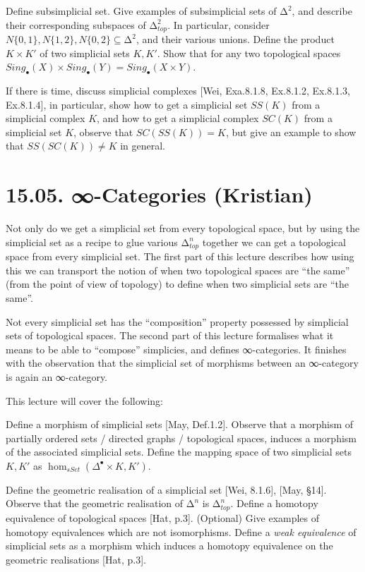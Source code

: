 \documentclass[a4paper]{amsart}
\numberwithin{figure}{section}
\theoremstyle{theorem}
\theoremstyle{definition}
\begin{document}
Define subsimplicial set. %
Give examples of subsimplicial sets of $∆^2$, and describe their corresponding subspaces of $∆^2_{top}$. In particular, consider $N\{0,1\}, N\{1,2\}, N\{0,2\} \subseteq ∆^2$, and their various unions. %
Define the product $K \times K'$ of two simplicial sets $K, K'$. %
Show that for any two topological spaces $Sing_\bullet(X) \times Sing_\bullet(Y) = Sing_\bullet(X \times Y)$. %

If there is time, discuss simplicial complexes [Wei, Exa.8.1.8, Ex.8.1.2, Ex.8.1.3, Ex.8.1.4], in particular, show how to get a simplicial set $SS(K)$ from a simplicial complex $K$, and how to get a simplicial complex $SC(K)$ from a simplicial set $K$, observe that $SC(SS(K)) = K$, but give an example to show that $SS(SC(K)) \neq K$ in general. 

\section{15.05. ∞-Categories (Kristian)} \label{Sec:InfCat}

Not only do we get a simplicial set from every topological space, but by using the simplicial set as a recipe to glue various $∆_{top}^n$ together we can get a topological space from every simplicial set. The first part of this lecture describes how using this we can transport the notion of when two topological spaces are ``the same'' (from the point of view of topology) to define when two simplicial sets are ``the same''.

Not every simplicial set has the ``composition'' property possessed by simplicial sets of topological spaces. The second part of this lecture formalises what it means to be able to ``compose'' simplicies, and defines ∞-categories. It finishes with the observation that the simplicial set of morphisms between an ∞-category is again an ∞-category.

This lecture will cover the following: 

Define a morphism of simplicial sets [May, Def.1.2]. %
Observe that a morphism of partially ordered sets / directed graphs / topological spaces, induces a morphism of the associated simplicial sets. %
Define the mapping space of two simplicial sets $K, K'$ as $\hom_{sSet}(\Delta^\bullet {\times} K, K')$. %

Define the geometric realisation of a simplicial set [Wei, 8.1.6], [May, §14]. %
Observe that the geometric realisation of $∆^n$ is $∆_{top}^n$. %
Define a homotopy equivalence of topological spaces [Hat, p.3]. %
(Optional) Give examples of homotopy equivalences which are not isomorphisms. %
Define a \emph{weak equivalence} of simplicial sets as a morphism which induces a homotopy equivalence on the geometric realisations [Hat, p.3]. %
\end{document}
